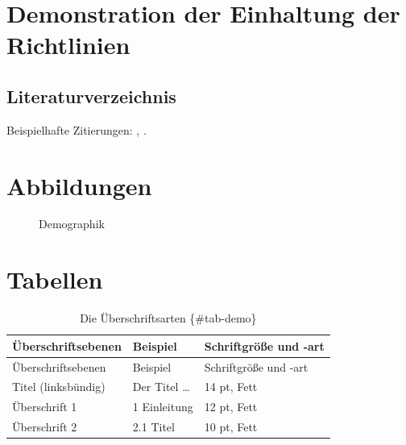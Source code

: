 \documentclass[
        english,biblatex
    ]{lni}
\begin{document}
    \section{Demonstration der Einhaltung der
    Richtlinien}\label{lniconformance}

    \subsection{Literaturverzeichnis}\label{literaturverzeichnis}

    Beispielhafte Zitierungen: \textcite{Ez10}, \textcite{AB00}.

    \section{Abbildungen}\label{abbildungen}

    \begin{figure}


    \caption{\label{fig-demo}Demographik}

    \end{figure}%

    \section{Tabellen}\label{tabellen}

    \begin{longtable}[]{@{}lll@{}}
    \caption{Die Überschriftsarten \{\#tab-demo\}}\tabularnewline
    \toprule\noalign{}
    Überschriftsebenen & Beispiel & Schriftgröße und -art \\
    \midrule\noalign{}
    \endfirsthead
    \toprule\noalign{}
    Überschriftsebenen & Beispiel & Schriftgröße und -art \\
    \midrule\noalign{}
    \endhead
    \bottomrule\noalign{}
    \endlastfoot
    Titel (linksbündig) & Der Titel \ldots{} & 14 pt, Fett \\
    Überschrift 1 & 1 Einleitung & 12 pt, Fett \\
    Überschrift 2 & 2.1 Titel & 10 pt, Fett \\
    \end{longtable}
\end{document}
